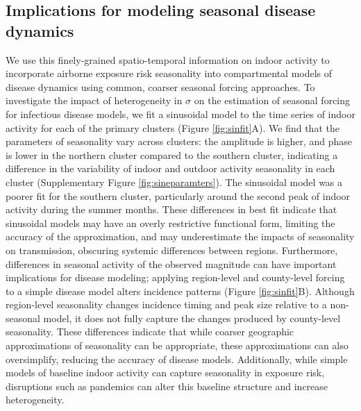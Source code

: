 \documentclass{article}
\begin{document}
\subsection*{Implications for modeling seasonal disease dynamics}
We use this finely-grained spatio-temporal information on indoor activity to incorporate airborne exposure risk seasonality into compartmental models of disease dynamics using common, coarser seasonal forcing approaches. To investigate the impact of heterogeneity in $\sigma$ on the estimation of seasonal forcing for infectious disease models, we fit a sinusoidal model to the time series of indoor activity for each of the primary clusters (Figure \ref{fig:sinfit}A). We find that the parameters of seasonality vary across clusters: the amplitude is higher, and phase is lower in the northern cluster compared to the southern cluster, indicating a difference in the variability of indoor and outdoor activity seasonality in each cluster (Supplementary Figure \ref{fig:sineparamters}). The sinusoidal model was a poorer fit for the southern cluster, particularly around the second peak of indoor activity during the summer months. These differences in best fit indicate that sinusoidal models may have an overly restrictive functional form, limiting the accuracy of the approximation, and may underestimate the impacts of seasonality on transmission,  obscuring systemic differences between regions. Furthermore, differences in seasonal activity of the observed magnitude can have important implications for disease modeling; applying region-level and county-level forcing to a simple disease model alters incidence patterns (Figure \ref{fig:sinfit}B). Although region-level seasonality changes incidence timing and peak size relative to a non-seasonal model, it does not fully capture the changes produced by county-level seasonality. These differences indicate that while coarser geographic approximations of seasonality can be appropriate, these approximations can also oversimplify, reducing the accuracy of disease models.   Additionally, while simple models of baseline indoor activity can capture seasonality in exposure risk, disruptions such as pandemics can alter this baseline structure and increase heterogeneity. 
\end{document}
